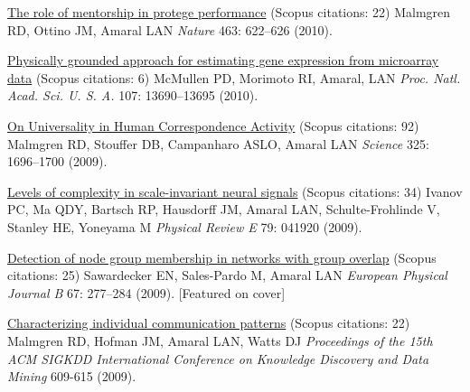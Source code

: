 \NumberedItem{\makebox[0.8cm][r]{[86]}}
\href{/people/amaral/role-mentorship-protege-performance}
{The role of mentorship in protege performance}
    (Scopus citations: 22)
\newline
Malmgren RD, Ottino JM, Amaral LAN
\newline
\textit{Nature}
    463:
622--626 (2010).
\newline
\Gap
~
\Gap

\NumberedItem{\makebox[0.8cm][r]{[85]}}
\href{/people/amaral/physically-grounded-approach-estimating-gene-expression-microarray-data}
{Physically grounded approach for estimating gene expression from microarray data}
    (Scopus citations: 6)
\newline
McMullen PD, Morimoto RI, Amaral, LAN
\newline
\textit{Proc. Natl. Acad. Sci. U. S. A.}
    107:
13690--13695 (2010).
\newline
\Gap
~
\Gap

\NumberedItem{\makebox[0.8cm][r]{[84]}}
\href{/people/amaral/universality-human-correspondence-activity}
{On Universality in Human Correspondence Activity}
    (Scopus citations: 92)
\newline
Malmgren RD, Stouffer DB, Campanharo ASLO, Amaral LAN
\newline
\textit{Science}
    325:
1696--1700 (2009).
\newline
\Gap
~
\Gap

\NumberedItem{\makebox[0.8cm][r]{[83]}}
\href{/people/amaral/levels-of-complexity-in-scale-invariant-neural-signals}
{Levels of complexity in scale-invariant neural signals}
    (Scopus citations: 34)
\newline
Ivanov PC, Ma QDY, Bartsch RP, Hausdorff JM, Amaral LAN, Schulte-Frohlinde V, Stanley HE, Yoneyama M
\newline
\textit{Physical Review E}
    79:
041920 (2009).
\newline
\Gap
~
\Gap

\NumberedItem{\makebox[0.8cm][r]{[82]}}
\href{/people/amaral/detection-of-node-group-membership-in-networks-with-group-overlap}
{Detection of node group membership in networks with group overlap}
    (Scopus citations: 25)
\newline
Sawardecker EN, Sales-Pardo M, Amaral LAN
\newline
\textit{European Physical Journal B}
    67:
277--284 (2009).
    [Featured on cover]
\newline
\Gap
~
\Gap

\NumberedItem{\makebox[0.8cm][r]{[81]}}
\href{/people/amaral/characterizing-individual-communication-patterns}
{Characterizing individual communication patterns}
    (Scopus citations: 22)
\newline
Malmgren RD, Hofman JM, Amaral LAN, Watts DJ
\newline
\textit{Proceedings of the 15th ACM SIGKDD International Conference on Knowledge Discovery and Data Mining}
609-615 (2009).
\newline
\Gap
~
\Gap

